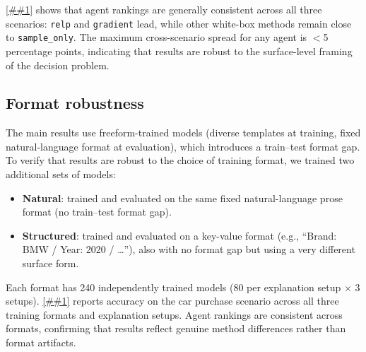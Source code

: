 \documentclass{article} %
\newcommand{\Cref}[1]{\ref{##1}}
\begin{document}
\Cref{tab:cross_scenario} shows that agent rankings are generally consistent across all three scenarios: \texttt{relp} and \texttt{gradient} lead, while other white-box methods remain close to \texttt{sample\_only}. The maximum cross-scenario spread for any agent is $<$5 percentage points, indicating that results are robust to the surface-level framing of the decision problem.

\subsection{Format robustness}
The main results use freeform-trained models (diverse templates at training, fixed natural-language format at evaluation), which introduces a train--test format gap.
To verify that results are robust to the choice of training format, we trained two additional sets of models:
\begin{itemize}[nosep,leftmargin=*]
    \item \textbf{Natural}: trained and evaluated on the same fixed natural-language prose format (no train--test format gap).
    \item \textbf{Structured}: trained and evaluated on a key-value format (e.g., ``Brand: BMW / Year: 2020 / \ldots''), also with no format gap but using a very different surface form.
\end{itemize}
Each format has 240 independently trained models (80 per explanation setup $\times$ 3 setups).
\Cref{tab:format_robustness} reports accuracy on the car purchase scenario across all three training formats and explanation setups.
Agent rankings are consistent across formats, confirming that results reflect genuine method differences rather than format artifacts.
\end{document}
